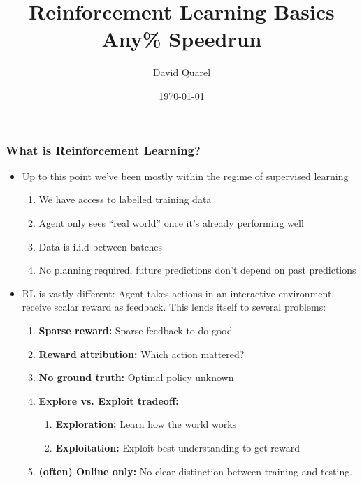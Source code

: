 \documentclass[10pt,a4paper]{beamer}
\begin{document}
\title[Reinforcement Learning Basics Any\% Speedrun] %
{Reinforcement Learning Basics Any\% Speedrun }

 
\author[David Quarel] %
{David Quarel}
 
 
\date[\today] %
{\today}
 
\frame{\titlepage}

\begin{frame}
\frametitle{What is Reinforcement Learning?}
\begin{itemize}
	\item Up to this point we've been mostly within the regime of 
	supervised learning
	\begin{enumerate} 
		\item We have access to labelled training data
		\item  Agent only sees ``real world'' once it's already performing well 
		\item Data is i.i.d between batches 
		\item No planning required, future predictions don't depend on past
		predictions
	\end{enumerate}  
	\pause
	\item RL is vastly different: Agent takes actions in an interactive environment,
	receive scalar reward as feedback. This lends itself to several problems:
	\begin{enumerate}
		\item  \textbf{Sparse reward:} Sparse feedback to do good

		\item \textbf{Reward attribution:} Which action mattered?

		\item \textbf{No ground truth:} Optimal policy unknown

		\item \textbf{Explore vs. Exploit tradeoff:}
		\begin{enumerate}
			\item \textbf{Exploration:} Learn how the world works
			\item \textbf{Exploitation:} Exploit best understanding to get reward
		\end{enumerate} 
	\item \textbf{(often) Online only:} No clear distinction between training and testing.
	\end{enumerate} 
\end{itemize}
	
\end{frame}
\end{document}
